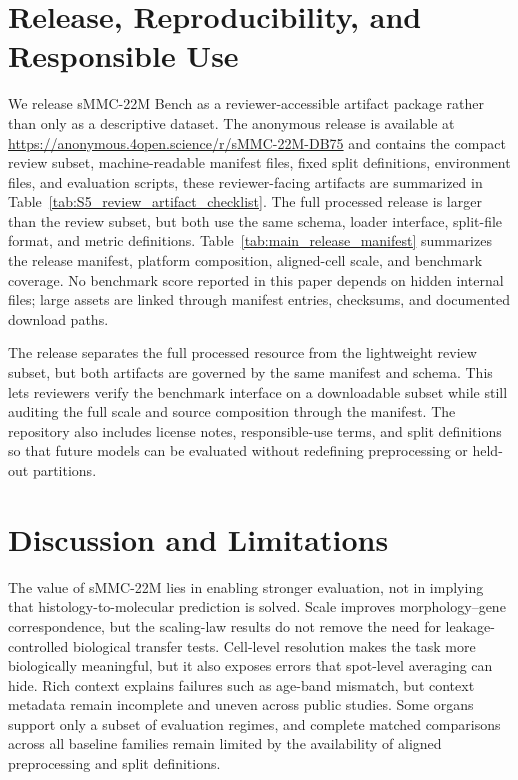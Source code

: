 \documentclass{article}
\newcommand{\dataset}{sMMC-22M\xspace}
\begin{document}
\section{Release, Reproducibility, and Responsible Use}
\label{sec:release_reproducibility}

We release \dataset Bench as a reviewer-accessible artifact package rather than only as a descriptive dataset. The anonymous release is available at \url{https://anonymous.4open.science/r/sMMC-22M-DB75} and contains the compact review subset, machine-readable manifest files, fixed split definitions, environment files, and evaluation scripts, these reviewer-facing artifacts are summarized in Table~\ref{tab:S5_review_artifact_checklist}. The full processed release is larger than the review subset, but both use the same schema, loader interface, split-file format, and metric definitions. Table~\ref{tab:main_release_manifest} summarizes the release manifest, platform composition, aligned-cell scale, and benchmark coverage. No benchmark score reported in this paper depends on hidden internal files; large assets are linked through manifest entries, checksums, and documented download paths.

The release separates the full processed resource from the lightweight review subset, but both artifacts are governed by the same manifest and schema. This lets reviewers verify the benchmark interface on a downloadable subset while still auditing the full scale and source composition through the manifest. The repository also includes license notes, responsible-use terms, and split definitions so that future models can be evaluated without redefining preprocessing or held-out partitions.

\section{Discussion and Limitations}
The value of \dataset lies in enabling stronger evaluation, not in implying that histology-to-molecular prediction is solved. Scale improves morphology--gene correspondence, but the scaling-law results do not remove the need for leakage-controlled biological transfer tests. Cell-level resolution makes the task more biologically meaningful, but it also exposes errors that spot-level averaging can hide. Rich context explains failures such as age-band mismatch, but context metadata remain incomplete and uneven across public studies. Some organs support only a subset of evaluation regimes, and complete matched comparisons across all baseline families remain limited by the availability of aligned preprocessing and split definitions.
\end{document}
